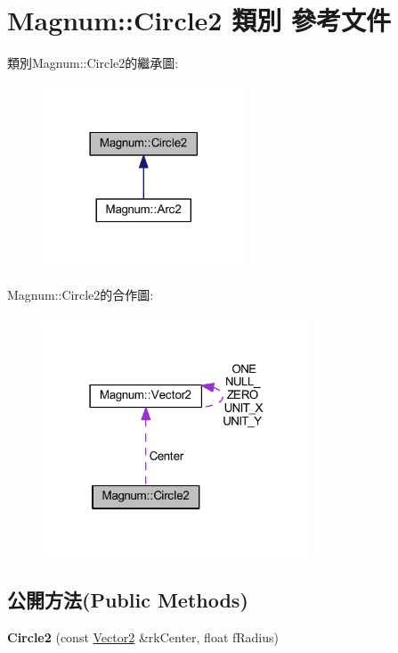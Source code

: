 \hypertarget{class_magnum_1_1_circle2}{}\section{Magnum\+:\+:Circle2 類別 參考文件}
\label{class_magnum_1_1_circle2}


類別\+Magnum\+:\+:Circle2的繼承圖\+:\nopagebreak
\begin{figure}[H]
\begin{center}
\leavevmode
\includegraphics[width=170pt]{class_magnum_1_1_circle2__inherit__graph}
\end{center}
\end{figure}


Magnum\+:\+:Circle2的合作圖\+:\nopagebreak
\begin{figure}[H]
\begin{center}
\leavevmode
\includegraphics[width=226pt]{class_magnum_1_1_circle2__coll__graph}
\end{center}
\end{figure}
\subsection*{公開方法(Public Methods)}
\begin{DoxyCompactItemize}
\item 
{\bfseries Circle2} (const \hyperlink{class_magnum_1_1_vector2}{Vector2} \&rk\+Center, float f\+Radius)\hypertarget{class_magnum_1_1_circle2_aae69b9e0bf15500a7e3424c283e7b12a}{}\label{class_magnum_1_1_circle2_aae69b9e0bf15500a7e3424c283e7b12a}

\end{DoxyCompactItemize}
